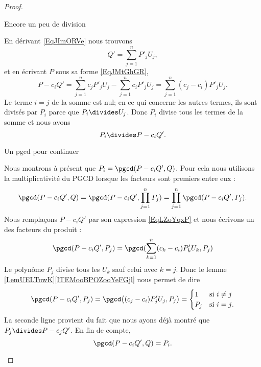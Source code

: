 \begin{proof}
\begin{subproof}
\item[Encore un peu de division]

    En dérivant \eqref{EqJImORVe} nous trouvons
    \begin{equation}
        Q'=\sum_{j=1}^nP'_jU_j,
    \end{equation}
    et en écrivant \( P\) sous sa forme \eqref{EqJMtGhGR},
    \begin{equation}    \label{EqLZoYqxP}
        P-c_iQ'=\sum_{j=1}^nc_jP'_jU_j-\sum_{j=1}^nc_iP'_jU_j=\sum_{j=1}^n(c_j-c_i)P'_jU_j.
    \end{equation}
    Le terme \( i=j\) de la somme est nul; en ce qui concerne les autres termes, ils sont divisés par \( P_i\) parce que \( P_i\divides U_j\). Donc \( P_i\) divise tous les termes de la somme et nous avons
    \begin{equation}
        P_i\divides P-c_iQ'.
    \end{equation}
    
\item[Un pgcd pour continuer]

    Nous montrons à présent que \( P_i=\pgcd(P-c_iQ',Q)\). Pour cela nous utilisons la multiplicativité du PGCD lorsque les facteurs sont premiers entre eux :
    \begin{equation}
        \pgcd(P-c_iQ',Q)=\pgcd(P-c_iQ',\prod_{j=1}^nP_j)=\prod_{j=1}^n\pgcd(P-c_iQ',P_j).
    \end{equation}
    Nous remplaçons \( P-c_iQ'\) par son expression \eqref{EqLZoYqxP} et nous écrivons un des facteurs du produit :
    \begin{equation}
        \pgcd(P-c_iQ',P_j)=\pgcd(\sum_{k=1}^n(c_k-c_i)P'_kU_k,P_j)
    \end{equation}
    Le polynôme \( P_j\) divise tous les \( U_k\) sauf celui avec \( k=j\). Donc le lemme \ref{LemUELTuwK}\ref{ITEMooBPOZooYeFGjl} nous permet de dire
    \begin{equation}
        \pgcd(P-c_iQ',P_j)=\pgcd\big( (c_j-c_i)P'_jU_j,P_j \big)=\begin{cases}
            1    &   \text{si } i\neq j\\
            P_j    &    \text{si } i=j\text{.}
        \end{cases}
    \end{equation}
    La seconde ligne provient du fait que nous ayons déjà montré que \( P_j\divides P-c_jQ'\). En fin de compte,
    \begin{equation}
        \pgcd(P-c_iQ',Q)=P_i.
    \end{equation}
    

\end{subproof}
\end{proof}
